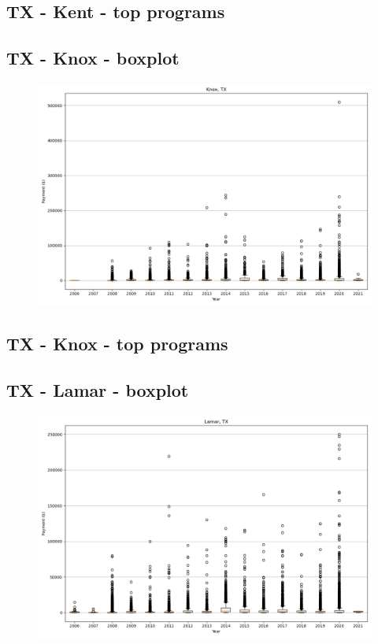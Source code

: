 \subsection*{TX - Kent - top programs}

\newpage
\subsection*{TX - Knox - boxplot}
\begin{figure}[h]
\centering
\includegraphics[width=7in]{../output/boxplots/counties/Knox-TX_boxplot.png}
\end{figure}


\subsection*{TX - Knox - top programs}

\newpage
\subsection*{TX - Lamar - boxplot}
\begin{figure}[h]
\centering
\includegraphics[width=7in]{../output/boxplots/counties/Lamar-TX_boxplot.png}
\end{figure}


